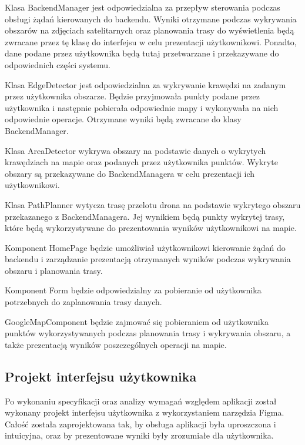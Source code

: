 Klasa BackendManager jest odpowiedzialna za przepływ sterowania podczas obsługi żądań kierowanych do backendu. Wyniki otrzymane podczas wykrywania obszarów na zdjęciach satelitarnych oraz planowania trasy do wyświetlenia będą zwracane przez tę klasę do interfejsu w celu prezentacji użytkownikowi. Ponadto, dane podane przez użytkownika będą tutaj przetwarzane i przekazywane do odpowiednich części systemu.

Klasa EdgeDetector jest odpowiedzialna za wykrywanie krawędzi na zadanym przez użytkownika obszarze. Będzie przyjmowała punkty podane przez użytkownika i następnie pobierała odpowiednie mapy i wykonywała na nich odpowiednie operacje. Otrzymane wyniki będą zwracane do klasy BackendManager.

Klasa AreaDetector wykrywa obszary na podstawie danych o wykrytych krawędziach na mapie oraz podanych przez użytkownika punktów. Wykryte obszary są przekazywane do BackendManagera w celu prezentacji ich użytkownikowi.

Klasa PathPlanner wytycza trasę przelotu drona na podstawie wykrytego obszaru przekazanego z BackendManagera. Jej wynikiem będą punkty wykrytej trasy, które będą wykorzystywane do prezentowania wyników użytkownikowi na mapie.

Komponent HomePage będzie umożliwiał użytkownikowi kierowanie żądań do backendu i zarządzanie prezentacją otrzymanych wyników podczas wykrywania obszaru i planowania trasy.

Komponent Form będzie odpowiedzialny za pobieranie od użytkownika potrzebnych do zaplanowania trasy danych.

GoogleMapComponent będzie zajmować się pobieraniem od użytkownika punktów wykorzystywanych podczas planowania trasy i wykrywania obszaru, a także prezentacją wyników poszczególnych operacji na mapie.

\subsection{Projekt interfejsu użytkownika}

Po wykonaniu specyfikacji oraz analizy wymagań względem aplikacji został wykonany projekt interfejsu użytkownika z wykorzystaniem narzędzia Figma. Całość została zaprojektowana tak, by obsługa aplikacji była uproszczona i intuicyjna, oraz by prezentowane wyniki były zrozumiałe dla użytkownika.


